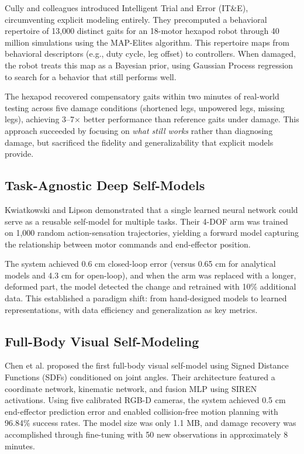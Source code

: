 \documentclass[journal]{IEEEtran}
\begin{document}
Cully and colleagues \cite{cully2015} introduced Intelligent Trial and Error (IT\&E), circumventing explicit modeling entirely. They precomputed a behavioral repertoire of 13,000 distinct gaits for an 18-motor hexapod robot through 40 million simulations using the MAP-Elites algorithm. This repertoire maps from behavioral descriptors (e.g., duty cycle, leg offset) to controllers. When damaged, the robot treats this map as a Bayesian prior, using Gaussian Process regression to search for a behavior that still performs well.

The hexapod recovered compensatory gaits within two minutes of real-world testing across five damage conditions (shortened legs, unpowered legs, missing legs), achieving 3--7$\times$ better performance than reference gaits under damage. This approach succeeded by focusing on \textit{what still works} rather than diagnosing damage, but sacrificed the fidelity and generalizability that explicit models provide.

\subsection{Task-Agnostic Deep Self-Models}

Kwiatkowski and Lipson \cite{kwiatkowski2019} demonstrated that a single learned neural network could serve as a reusable self-model for multiple tasks. Their 4-DOF arm was trained on 1,000 random action-sensation trajectories, yielding a forward model capturing the relationship between motor commands and end-effector position.

The system achieved 0.6 cm closed-loop error (versus 0.65 cm for analytical models and 4.3 cm for open-loop), and when the arm was replaced with a longer, deformed part, the model detected the change and retrained with 10\% additional data. This established a paradigm shift: from hand-designed models to learned representations, with data efficiency and generalization as key metrics.

\subsection{Full-Body Visual Self-Modeling}

Chen et al. \cite{chen2022} proposed the first full-body visual self-model using Signed Distance Functions (SDFs) conditioned on joint angles. Their architecture featured a coordinate network, kinematic network, and fusion MLP using SIREN activations. Using five calibrated RGB-D cameras, the system achieved 0.5 cm end-effector prediction error and enabled collision-free motion planning with 96.84\% success rates. The model size was only 1.1 MB, and damage recovery was accomplished through fine-tuning with 50 new observations in approximately 8 minutes.
\end{document}
